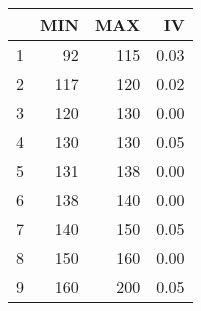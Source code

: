\begin{table}[ht]
\centering
\begin{tabular}{rrrr}
  \hline
 & MIN & MAX & IV \\ 
  \hline
1 &  92 & 115 & 0.03 \\ 
  2 & 117 & 120 & 0.02 \\ 
  3 & 120 & 130 & 0.00 \\ 
  4 & 130 & 130 & 0.05 \\ 
  5 & 131 & 138 & 0.00 \\ 
  6 & 138 & 140 & 0.00 \\ 
  7 & 140 & 150 & 0.05 \\ 
  8 & 150 & 160 & 0.00 \\ 
  9 & 160 & 200 & 0.05 \\ 
   \hline
\end{tabular}
\end{table}
